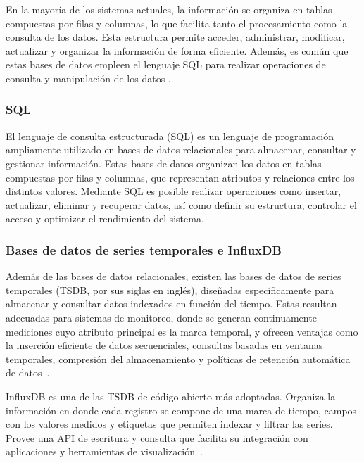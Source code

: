 En la mayoría de los sistemas actuales, la información se organiza en tablas compuestas por filas y columnas, lo que facilita tanto el procesamiento como la consulta de los datos. Esta estructura permite acceder, administrar, modificar, actualizar y organizar la información de forma eficiente. Además, es común que estas bases de datos empleen el lenguaje SQL para realizar operaciones de consulta y manipulación de los datos \cite{oracle_what_is_database}.

\subsubsection{SQL}

El lenguaje de consulta estructurada (SQL) es un lenguaje de programación ampliamente utilizado en bases de datos relacionales para almacenar, consultar y gestionar información. Estas bases de datos organizan los datos en tablas compuestas por filas y columnas, que representan atributos y relaciones entre los distintos valores. Mediante SQL es posible realizar operaciones como insertar, actualizar, eliminar y recuperar datos, así como definir su estructura, controlar el acceso y optimizar el rendimiento del sistema.

\subsubsection{Bases de datos de series temporales e InfluxDB}
\label{sec:tsdb}
Además de las bases de datos relacionales, existen las bases de datos de series temporales (TSDB, por sus siglas en inglés), diseñadas específicamente para almacenar y consultar datos indexados en función del tiempo. Estas resultan adecuadas para sistemas de monitoreo, donde se generan continuamente mediciones cuyo atributo principal es la marca temporal, y ofrecen ventajas como la inserción eficiente de datos secuenciales, consultas basadas en ventanas temporales, compresión del almacenamiento y políticas de retención automática de datos~\cite{influxdb}.

InfluxDB es una de las TSDB de código abierto más adoptadas. Organiza la información en  donde cada registro se compone de una marca de tiempo, campos con los valores medidos y etiquetas que permiten indexar y filtrar las series. Provee una API de escritura y consulta que facilita su integración con aplicaciones y herramientas de visualización~\cite{influxdb}.

